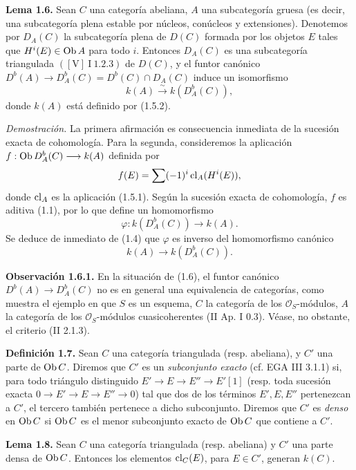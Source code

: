 \textbf{Lema 1.6.} Sean \(C\) una categoría abeliana, \(A\) una subcategoría gruesa (es decir, una subcategoría plena estable por núcleos, conúcleos y extensiones). Denotemos por \(D_A(C)\) la subcategoría plena de \(D(C)\) formada por los objetos \(E\) tales que \(H^i(E)\in\operatorname{Ob} A\) para todo \(i\). Entonces \(D_A(C)\) es una subcategoría triangulada \(([\mathrm V]\ \mathrm I\ 1.2.3)\) de \(D(C)\), y el funtor canónico \(D^b(A)\longrightarrow D_A^b(C)=D^b(C)\cap D_A(C)\) induce un isomorfismo
\[
 k(A)\xrightarrow{\sim} k(D_A^b(C)),
\]
donde \(k(A)\) está definido por (1.5.2).

\emph{Demostración.} La primera afirmación es consecuencia inmediata de la sucesión exacta de cohomología. Para la segunda, consideremos la aplicación \(f:\operatorname{Ob} D_A^b(C)\longrightarrow k(A)\) definida por
\[
 f(E)=\sum(-1)^i\operatorname{cl}_A(H^i(E)),
\]
donde \(\operatorname{cl}_A\) es la aplicación (1.5.1). Según la sucesión exacta de cohomología, \(f\) es aditiva (1.1), por lo que define un homomorfismo
\[
 \varphi:k(D_A^b(C))\longrightarrow k(A).
\]
Se deduce de inmediato de (1.4) que \(\varphi\) es inverso del homomorfismo canónico
\[
 k(A)\longrightarrow k(D_A^b(C)).
\]

\textbf{Observación 1.6.1.} En la situación de (1.6), el funtor canónico \(D^b(A)\longrightarrow D_A^b(C)\) no es en general una equivalencia de categorías, como muestra el ejemplo en que \(S\) es un esquema, \(C\) la categoría de los \(\mathcal O_S\)-módulos, \(A\) la categoría de los \(\mathcal O_S\)-módulos cuasicoherentes (II Ap. I 0.3). Véase, no obstante, el criterio (II 2.1.3).

\textbf{Definición 1.7.} Sean \(C\) una categoría triangulada (resp. abeliana), y \(C'\) una parte de \(\operatorname{Ob} C\). Diremos que \(C'\) es un \emph{subconjunto exacto} (cf. EGA III 3.1.1) si, para todo triángulo distinguido \(E'\to E\to E''\to E'[1]\) (resp. toda sucesión exacta \(0\to E'\to E\to E''\to0\)) tal que dos de los términos \(E',E,E''\) pertenezcan a \(C'\), el tercero también pertenece a dicho subconjunto. Diremos que \(C'\) es \emph{denso} en \(\operatorname{Ob} C\) si \(\operatorname{Ob} C\) es el menor subconjunto exacto de \(\operatorname{Ob} C\) que contiene a \(C'\).

\textbf{Lema 1.8.} Sean \(C\) una categoría triangulada (resp. abeliana) y \(C'\) una parte densa de \(\operatorname{Ob} C\). Entonces los elementos \(\operatorname{cl}_C(E)\), para \(E\in C'\), generan \(k(C)\).

